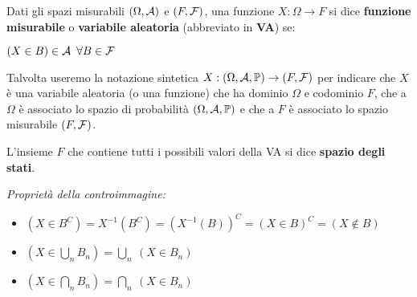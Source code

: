 \smallskip
\begin{defn}
  Dati gli spazi misurabili $(\Omega, \mathcal A)$ e $(F, \mathcal F)$,
  una funzione $X: \Omega \to F$ si dice \textbf{funzione misurabile}
  o \textbf{variabile aleatoria} (abbreviato in \textbf{VA}) se:
  \begin{center}
  	$(X \in B) \in \mathcal A \enspace \forall B \in \mathcal F$
  \end{center}
\end{defn}
Talvolta useremo la notazione sintetica $X: (\Omega, \mathcal A, \mathbb P) \to (F, \mathcal F)$ per indicare che $X$ è una variabile aleatoria (o una funzione) che ha dominio $\Omega$ e codominio $F$, che a $\Omega$ è associato lo spazio di probabilità $(\Omega, \mathcal A, \mathbb P)$ e che a $F$ è associato lo spazio misurabile $(F, \mathcal F)$.

\smallskip
\begin{defn}
  L'insieme $F$ che contiene tutti
  i possibili valori della VA si dice \textbf{spazio degli stati}.
\end{defn}

\textit{Proprietà della controimmagine:}
\begin{itemize}
  \item $(X \in B^C) = X^{-1}(B^C) = (X^{-1}(B))^C = (X \in B)^C = (X \not\in B)$
  \item $(X \in \bigcup\limits_n B_n) = \bigcup\limits_n \ (X \in B_n)$
  \item $(X \in \bigcap\limits_n B_n) = \bigcap\limits_n \ (X \in B_n)$
\end{itemize}

